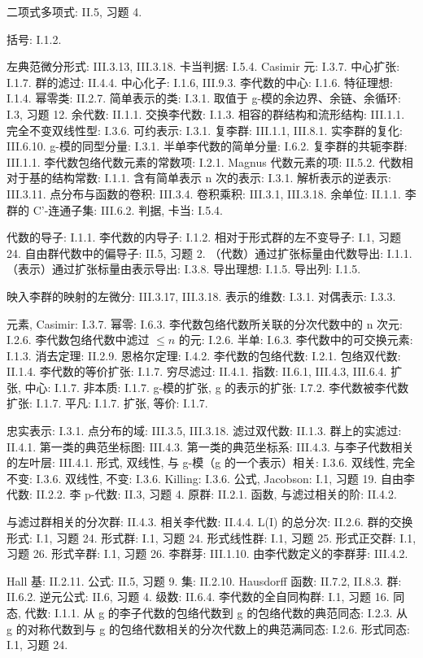 二项式多项式: II.5, 习题 4.

括号: I.1.2.

左典范微分形式: III.3.13, III.3.18. 卡当判据: I.5.4. Casimir 元: I.3.7. 中心扩张: I.1.7. 群的滤过: II.4.4. 中心化子: I.1.6, III.9.3. 李代数的中心: I.1.6. 特征理想: I.1.4. 幂零类: II.2.7. 简单表示的类: I.3.1. 取值于 g-模的余边界、余链、余循环: I.3, 习题 12. 余代数: II.1.1. 交换李代数: I.1.3. 相容的群结构和流形结构: III.1.1. 完全不变双线性型: I.3.6. 可约表示: I.3.1. 复李群: III.1.1, III.8.1. 实李群的复化: III.6.10. g-模的同型分量: I.3.1. 半单李代数的简单分量: I.6.2. 复李群的共轭李群: III.1.1. 李代数包络代数元素的常数项: I.2.1. Magnus 代数元素的项: II.5.2. 代数相对于基的结构常数: I.1.1. 含有简单表示 n 次的表示: I.3.1. 解析表示的逆表示: III.3.11. 点分布与函数的卷积: III.3.4. 卷积乘积: III.3.1, III.3.18. 余单位: II.1.1. 李群的 C'-连通子集: III.6.2. 判据, 卡当: I.5.4.

代数的导子: I.1.1. 李代数的内导子: I.1.2. 相对于形式群的左不变导子: I.1, 习题 24. 自由群代数中的偏导子: II.5, 习题 2. （代数）通过扩张标量由代数导出: I.1.1. （表示）通过扩张标量由表示导出: I.3.8. 导出理想: I.1.5. 导出列: I.1.5.

映入李群的映射的左微分: III.3.17, III.3.18. 表示的维数: I.3.1. 对偶表示: I.3.3.

元素, Casimir: I.3.7. 幂零: I.6.3. 李代数包络代数所关联的分次代数中的 n 次元: I.2.6. 李代数包络代数中滤过 \(\leqslant n\) 的元: I.2.6. 半单: I.6.3. 李代数中的可交换元素: I.1.3. 消去定理: II.2.9. 恩格尔定理: I.4.2. 李代数的包络代数: I.2.1. 包络双代数: II.1.4. 李代数的等价扩张: I.1.7. 穷尽滤过: II.4.1. 指数: II.6.1, III.4.3, III.6.4. 扩张, 中心: I.1.7. 非本质: I.1.7. g-模的扩张, g 的表示的扩张: I.7.2. 李代数被李代数扩张: I.1.7. 平凡: I.1.7. 扩张, 等价: I.1.7.

忠实表示: I.3.1. 点分布的域: III.3.5, III.3.18. 滤过双代数: II.1.3. 群上的实滤过: II.4.1. 第一类的典范坐标图: III.4.3. 第一类的典范坐标系: III.4.3. 与李子代数相关的左叶层: III.4.1. 形式, 双线性, 与 g-模（g 的一个表示）相关: I.3.6. 双线性, 完全不变: I.3.6. 双线性, 不变: I.3.6. Killing: I.3.6. 公式, Jacobson: I.1, 习题 19. 自由李代数: II.2.2. 李 p-代数: II.3, 习题 4. 原群: II.2.1. 函数, 与滤过相关的阶: II.4.2.

与滤过群相关的分次群: II.4.3. 相关李代数: II.4.4. L(I) 的总分次: II.2.6. 群的交换形式: I.1, 习题 24. 形式群: I.1, 习题 24. 形式线性群: I.1, 习题 25. 形式正交群: I.1, 习题 26. 形式辛群: I.1, 习题 26. 李群芽: III.1.10. 由李代数定义的李群芽: III.4.2.

Hall 基: II.2.11. 公式: II.5, 习题 9. 集: II.2.10. Hausdorff 函数: II.7.2, II.8.3. 群: II.6.2. 逆元公式: II.6, 习题 4. 级数: II.6.4. 李代数的全自同构群: I.1, 习题 16. 同态, 代数: I.1.1. 从 g 的李子代数的包络代数到 g 的包络代数的典范同态: I.2.3. 从 g 的对称代数到与 g 的包络代数相关的分次代数上的典范满同态: I.2.6. 形式同态: I.1, 习题 24.

